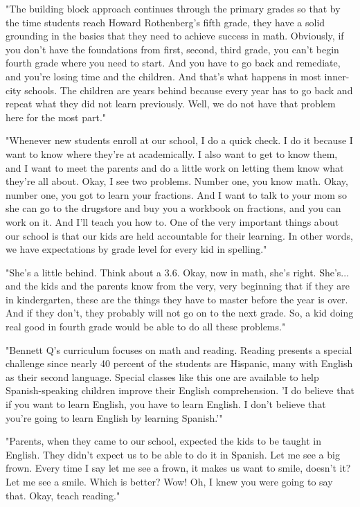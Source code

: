 "The building block approach continues through the primary grades so that by the time students reach Howard Rothenberg's fifth grade, they have a solid grounding in the basics that they need to achieve success in math. Obviously, if you don't have the foundations from first, second, third grade, you can't begin fourth grade where you need to start. And you have to go back and remediate, and you're losing time and the children. And that's what happens in most inner-city schools. The children are years behind because every year has to go back and repeat what they did not learn previously. Well, we do not have that problem here for the most part."

"Whenever new students enroll at our school, I do a quick check. I do it because I want to know where they're at academically. I also want to get to know them, and I want to meet the parents and do a little work on letting them know what they're all about. Okay, I see two problems. Number one, you know math. Okay, number one, you got to learn your fractions. And I want to talk to your mom so she can go to the drugstore and buy you a workbook on fractions, and you can work on it. And I'll teach you how to. One of the very important things about our school is that our kids are held accountable for their learning. In other words, we have expectations by grade level for every kid in spelling."

"She's a little behind. Think about a 3.6. Okay, now in math, she's right. She's... and the kids and the parents know from the very, very beginning that if they are in kindergarten, these are the things they have to master before the year is over. And if they don't, they probably will not go on to the next grade. So, a kid doing real good in fourth grade would be able to do all these problems."

"Bennett Q's curriculum focuses on math and reading. Reading presents a special challenge since nearly 40 percent of the students are Hispanic, many with English as their second language. Special classes like this one are available to help Spanish-speaking children improve their English comprehension. 'I do believe that if you want to learn English, you have to learn English. I don't believe that you're going to learn English by learning Spanish.'"

"Parents, when they came to our school, expected the kids to be taught in English. They didn't expect us to be able to do it in Spanish. Let me see a big frown. Every time I say let me see a frown, it makes us want to smile, doesn't it? Let me see a smile. Which is better? Wow! Oh, I knew you were going to say that. Okay, teach reading."

